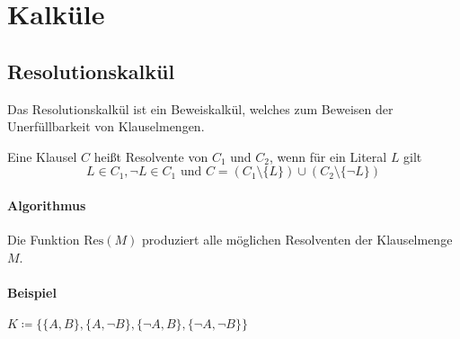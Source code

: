     \section{Kalküle}
        \subsection{Resolutionskalkül}
            \label{subsec:reso}

            Das Resolutionskalkül ist ein Beweiskalkül, welches zum Beweisen der Unerfüllbarkeit von Klauselmengen.

            Eine Klausel $ C $ heißt Resolvente von $ C _ 1 $ und $ C _ 2 $, wenn für ein Literal $ L $ gilt \[ L \in C _ 1, \lnot L \in C _ 1 \text{ und } C = (C _ 1 \setminus \{ L \}) \cup (C _ 2 \setminus \{ \lnot L \}) \]

            \paragraph{Algorithmus}
                Die Funktion $ \text{Res}(M) $ produziert alle möglichen Resolventen der Klauselmenge $ M $.

                \begin{algorithm}[H]

                     
                \end{algorithm}

            \paragraph{Beispiel}
                $ K \coloneqq \{ \{ A, B \}, \{ A, \lnot B \}, \{ \lnot A, B \}, \{ \lnot A, \lnot B \} \} $

                \begin{figure}[H]
                    \centering
                \end{figure}

